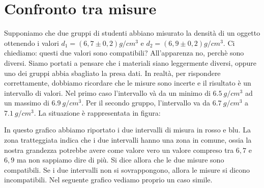 \section{Confronto tra misure}
Supponiamo che due gruppi di studenti abbiano misurato la densità di un oggetto ottenendo i valori $d_1=\left(6,7 \pm 0,2\right)\si{g/cm^3}$ e $d_2=\left(6,9 \pm 0,2\right)\si{g/cm^3}$. Ci chiediamo: questi due valori sono compatibili? All'apparenza no, perchè sono diversi. Siamo portati a pensare che i materiali siano leggermente diversi, oppure uno dei gruppi abbia sbagliato la presa dati. In realtà, per rispondere correttamente, dobbiamo ricordare che le misure sono incerte e il risultato è un intervallo di valori. Nel primo caso l'intervallo và da un minimo di $\SI{6,5}{g/	cm^3}$ ad un massimo di $\SI{6,9}{g/cm^3}$. Per il secondo gruppo, l'intervallo va da $\SI{6,7}{g/cm^3}$ a $\SI{7,1}{g/cm^3}$. La situazione è rappresentata in figura:


In questo grafico abbiamo riportato i due intervalli di misura in rosso e blu. La zona tratteggiata indica che i due intervalli hanno una zona in comune, ossia la nostra grandezza potrebbe avere come valore vero un valore compreso tra $6,7$ e $6,9$ ma non sappiamo dire di più. Si dice allora che le due misure sono compatibili. Se i due intervalli non si sovrappongono, allora le misure si dicono incompatibili. Nel seguente grafico vediamo proprio un caso simile.

